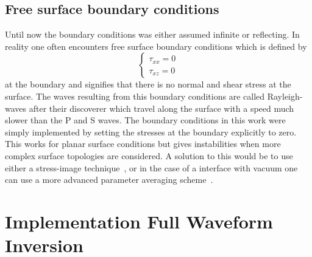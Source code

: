 \documentclass[10pt]{SelfArx} %
\theoremstyle{definition}
\begin{document}
\subsection{Free surface boundary conditions}
Until now the boundary conditions was either assumed infinite or reflecting. In reality one often encounters free surface boundary conditions which is defined by
\begin{equation}\label{eq:free_surface_conditions}
\left\{
\begin{aligned}
\tau_{xx} = 0 \\
\tau_{xz} = 0
\end{aligned}
\right.
\end{equation}
at the boundary and signifies that there is no normal and shear stress at the surface. The waves resulting from this boundary conditions are called Rayleigh-waves after their discoverer which travel along the surface with a speed much slower than the P and S waves. The boundary conditions in this work were simply implemented by setting the stresses at the boundary explicitly to zero. This works for planar surface conditions but gives instabilities when more complex surface topologies are considered. A solution to this would be to use either a stress-image technique~\cite{Levander1988}, or in the case of a interface with vacuum one can use a more advanced parameter averaging scheme~\cite{Zeng2012}.



\section{Implementation Full Waveform Inversion}
\end{document}
